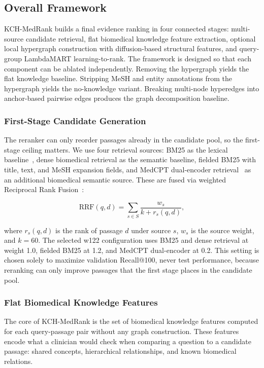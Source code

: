 \subsection{Overall Framework}



KCH-MedRank builds a final evidence ranking in four connected stages: multi-source candidate retrieval, flat biomedical knowledge feature extraction, optional local hypergraph construction with diffusion-based structural features, and query-group LambdaMART learning-to-rank. The framework is designed so that each component can be ablated independently. Removing the hypergraph yields the flat knowledge baseline. Stripping MeSH and entity annotations from the hypergraph yields the no-knowledge variant. Breaking multi-node hyperedges into anchor-based pairwise edges produces the graph decomposition baseline.

\subsubsection{First-Stage Candidate Generation}

The reranker can only reorder passages already in the candidate pool, so the first-stage ceiling matters. We use four retrieval sources: BM25 as the lexical baseline~\citep{robertson2009bm25}, dense biomedical retrieval as the semantic baseline, fielded BM25 with title, text, and MeSH expansion fields, and MedCPT dual-encoder retrieval~\citep{jin2023medcpt} as an additional biomedical semantic source. These are fused via weighted Reciprocal Rank Fusion~\citep{cormack2009rrf}:

\[
  \mathrm{RRF}(q,d)=\sum_{s \in S}\frac{w_s}{k+r_s(q,d)},
\]

where $r_s(q,d)$ is the rank of passage $d$ under source $s$, $w_s$ is the source weight, and $k=60$. The selected w122 configuration uses BM25 and dense retrieval at weight 1.0, fielded BM25 at 1.2, and MedCPT dual-encoder at 0.2. This setting is chosen solely to maximize validation Recall@100, never test performance, because reranking can only improve passages that the first stage places in the candidate pool.

\subsubsection{Flat Biomedical Knowledge Features}

The core of KCH-MedRank is the set of biomedical knowledge features computed for each query-passage pair without any graph construction. These features encode what a clinician would check when comparing a question to a candidate passage: shared concepts, hierarchical relationships, and known biomedical relations.

